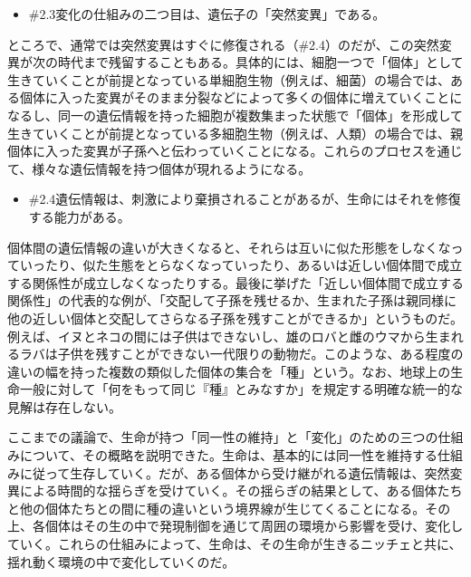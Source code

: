\begin{note}{}
  \begin{itemize}
    \tightlist
    \item{\#2.3}変化の仕組みの二つ目は、遺伝子の「突然変異」である。
  \end{itemize}
\end{note}

ところで、通常では突然変異はすぐに修復される（\#2.4）のだが、この突然変異が次の時代まで残留することもある。具体的には、細胞一つで「個体」として生きていくことが前提となっている単細胞生物（例えば、細菌）の場合では、ある個体に入った変異がそのまま分裂などによって多くの個体に増えていくことになるし、同一の遺伝情報を持った細胞が複数集まった状態で「個体」を形成して生きていくことが前提となっている多細胞生物（例えば、人類）の場合では、親個体に入った変異が子孫へと伝わっていくことになる。これらのプロセスを通じて、様々な遺伝情報を持つ個体が現れるようになる。

\begin{note}{}
  \begin{itemize}
    \tightlist
    \item{\#2.4}遺伝情報は、刺激により棄損されることがあるが、生命にはそれを修復する能力がある。
  \end{itemize}
\end{note}

個体間の遺伝情報の違いが大きくなると、それらは互いに似た形態をしなくなっていったり、似た生態をとらなくなっていったり、あるいは近しい個体間で成立する関係性が成立しなくなったりする。最後に挙げた「近しい個体間で成立する関係性」の代表的な例が、「交配して子孫を残せるか、生まれた子孫は親同様に他の近しい個体と交配してさらなる子孫を残すことができるか」というものだ。例えば、イヌとネコの間には子供はできないし、雄のロバと雌のウマから生まれるラバは子供を残すことができない一代限りの動物だ。このような、ある程度の違いの幅を持った複数の類似した個体の集合を「種」という。なお、地球上の生命一般に対して「何をもって同じ『種』とみなすか」を規定する明確な統一的な見解は存在しない。

ここまでの議論で、生命が持つ「同一性の維持」と「変化」のための三つの仕組みについて、その概略を説明できた。生命は、基本的には同一性を維持する仕組みに従って生存していく。だが、ある個体から受け継がれる遺伝情報は、突然変異による時間的な揺らぎを受けていく。その揺らぎの結果として、ある個体たちと他の個体たちとの間に種の違いという境界線が生じてくることになる。その上、各個体はその生の中で発現制御を通じて周囲の環境から影響を受け、変化していく。これらの仕組みによって、生命は、その生命が生きるニッチェと共に、揺れ動く環境の中で変化していくのだ。

